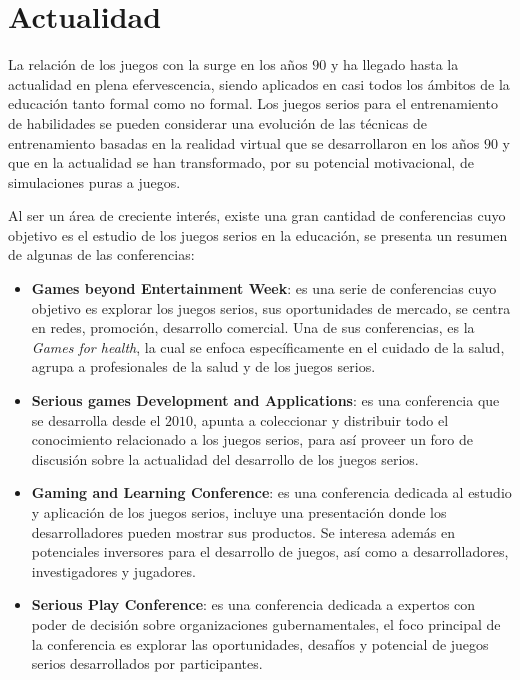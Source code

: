 \section{Actualidad}

La relación de los juegos con la  surge en los años $90$ y ha llegado hasta la actualidad en plena
efervescencia, siendo aplicados en casi todos los ámbitos de la educación tanto
formal como no formal. Los juegos serios para el entrenamiento de habilidades se
pueden considerar una evolución de las técnicas de entrenamiento basadas en la
realidad virtual que se desarrollaron en los años $90$ y que en la actualidad se
han transformado, por su potencial motivacional, de simulaciones puras a
juegos\cite{videojuegos:gonzaleztardon}.

Al ser un área de creciente interés, existe una gran cantidad de conferencias
cuyo objetivo es el estudio de los juegos serios en la educación, se presenta un
resumen de algunas de las conferencias:

\begin{itemize}
\item \textbf{Games beyond Entertainment Week}: es una serie de conferencias
    cuyo objetivo es explorar los juegos serios, sus oportunidades de mercado,
    se centra en redes, promoción, desarrollo comercial. Una de sus
    conferencias, es la \emph{Games for health}, la cual se enfoca
    específicamente en el cuidado de la salud, agrupa a profesionales de la
    salud y de los juegos serios\cite{games_beyond_entertainment}.
\item \textbf{Serious games Development and Applications}: es una conferencia
    que se desarrolla desde el $2010$, apunta a coleccionar y distribuir todo el
    conocimiento relacionado a los juegos serios, para así proveer un foro de
    discusión sobre la actualidad del desarrollo de los juegos
    serios\cite{sgda}.
\item \textbf{Gaming and Learning Conference}: es una conferencia dedicada al
    estudio y aplicación de los juegos serios, incluye una presentación donde
    los desarrolladores pueden mostrar sus productos. Se interesa además en
    potenciales inversores para el desarrollo de juegos, así como a
    desarrolladores, investigadores y jugadores\cite{gala}.
\item \textbf{Serious Play Conference}: es una conferencia dedicada a expertos
    con poder de decisión sobre organizaciones gubernamentales, el foco
    principal de la conferencia es explorar las oportunidades, desafíos y
    potencial de juegos serios desarrollados por
    participantes\cite{seriousplay}.
\end{itemize}

